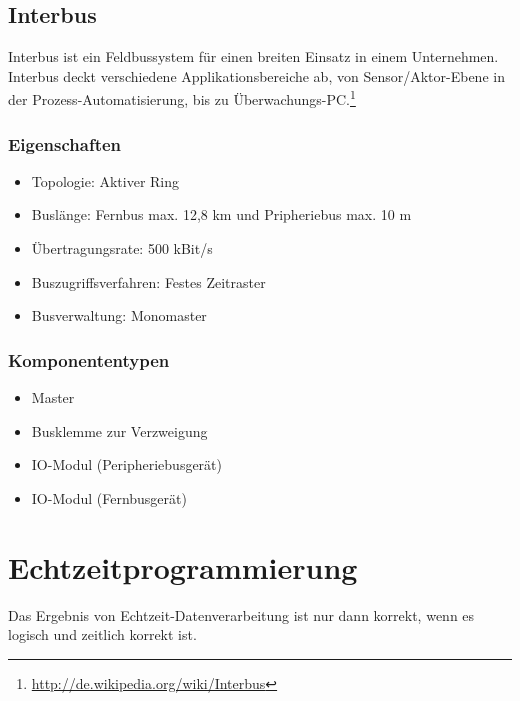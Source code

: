 \subsection{Interbus}
Interbus ist ein Feldbussystem für einen breiten Einsatz in einem Unternehmen. Interbus deckt verschiedene Applikationsbereiche ab, von Sensor/Aktor-Ebene in der Prozess-Automatisierung, bis zu Überwachungs-PC.\footnote{\url{http://de.wikipedia.org/wiki/Interbus}}

\subsubsection{Eigenschaften}
\begin{itemize}
	\item Topologie: Aktiver Ring
	\item Buslänge: Fernbus max. 12,8 km und Pripheriebus max. 10 m
	\item Übertragungsrate: 500 kBit/s
	\item Buszugriffsverfahren: Festes Zeitraster
	\item Busverwaltung: Monomaster
\end{itemize}

\subsubsection{Komponententypen}
\begin{itemize}
	\item Master
	\item Busklemme zur Verzweigung
	\item IO-Modul (Peripheriebusgerät)
	\item IO-Modul (Fernbusgerät)
\end{itemize}



\section{Echtzeitprogrammierung}
Das Ergebnis von Echtzeit-Datenverarbeitung ist nur dann korrekt, wenn es logisch und zeitlich korrekt ist.


